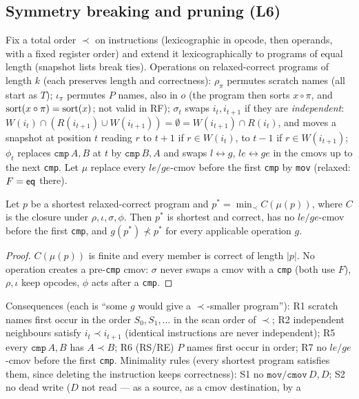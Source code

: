\subsection{Symmetry breaking and pruning (L6)}\label{lem:master}
Fix a total order $\prec$ on instructions (lexicographic in opcode, then operands, with a fixed register order) and
extend it lexicographically to programs of equal length (snapshot lists break ties).
Operations on relaxed-correct \RS{} programs of length $k$ (each preserves length and correctness):
$\rho_\pi$ permutes scratch names (all start as $T$);
$\iota_\pi$ permutes $P$ names, also in $o$ (the program then sorts $x\circ\pi$, and $\mathrm{sort}(x\circ\pi)=\mathrm{sort}(x)$; not valid in RF);
$\sigma_t$ swaps $i_t,i_{t+1}$ if they are \emph{independent}:
$W(i_t)\cap(R(i_{t+1})\cup W(i_{t+1}))=\emptyset=W(i_{t+1})\cap R(i_t)$, and moves a snapshot at position $t$ reading
$r$ to $t+1$ if $r\in W(i_t)$, to $t-1$ if $r\in W(i_{t+1})$;
$\phi_t$ replaces $\texttt{cmp}\,A,B$ at $t$ by $\texttt{cmp}\,B,A$ and swaps $l\leftrightarrow g$, $le\leftrightarrow ge$ in
the cmovs up to the next \texttt{cmp}.
Let $\mu$ replace every $le/ge$-cmov before the first \texttt{cmp} by \texttt{mov} (relaxed: $F=\mathsf{eq}$ there).
\begin{lemma}
Let $p$ be a shortest relaxed-correct program and $p^\ast=\min_\prec C(\mu(p))$, where $C$ is the closure under
$\rho,\iota,\sigma,\phi$. Then $p^\ast$ is shortest and correct, has no $le/ge$-cmov before the first \texttt{cmp}, and
$g(p^\ast)\not\prec p^\ast$ for every applicable operation $g$.
\end{lemma}
\begin{proof} $C(\mu(p))$ is finite and every member is correct of length $|p|$. No operation creates a pre-\texttt{cmp} cmov:
$\sigma$ never swaps a cmov with a \texttt{cmp} (both use $F$), $\rho,\iota$ keep opcodes, $\phi$ acts after a \texttt{cmp}. \end{proof}
Consequences (each is ``some $g$ would give a $\prec$-smaller program''):
R1 scratch names first occur in the order $S_0,S_1,\dots$ in the scan order of $\prec$;
R2 independent neighbours satisfy $i_t\prec i_{t+1}$ (identical instructions are never independent);
R5 every $\texttt{cmp}\,A,B$ has $A\prec B$;
R6 (RS/RE) $P$ names first occur in order;
R7 no $le/ge$-cmov before the first \texttt{cmp}.
Minimality rules (every shortest program satisfies them, since deleting the instruction keeps correctness):
S1 no $\texttt{mov}/\texttt{cmov}\,D,D$; S2 no dead write ($D$ not read --- as a source, as a cmov destination, by a
